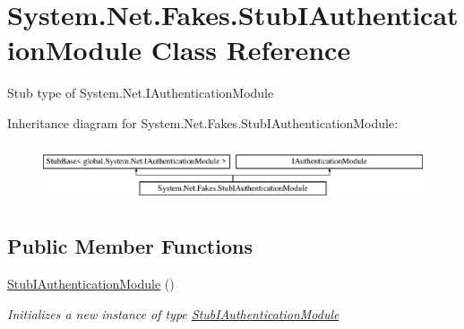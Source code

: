 \hypertarget{class_system_1_1_net_1_1_fakes_1_1_stub_i_authentication_module}{\section{System.\-Net.\-Fakes.\-Stub\-I\-Authentication\-Module Class Reference}
\label{class_system_1_1_net_1_1_fakes_1_1_stub_i_authentication_module}
}


Stub type of System.\-Net.\-I\-Authentication\-Module 


Inheritance diagram for System.\-Net.\-Fakes.\-Stub\-I\-Authentication\-Module\-:\begin{figure}[H]
\begin{center}
\leavevmode
\includegraphics[height=1.712538cm]{class_system_1_1_net_1_1_fakes_1_1_stub_i_authentication_module}
\end{center}
\end{figure}
\subsection*{Public Member Functions}
\begin{DoxyCompactItemize}
\item 
\hyperlink{class_system_1_1_net_1_1_fakes_1_1_stub_i_authentication_module_a0e4aa8f6fbaf4ace12a8e43ca03eb3fa}{Stub\-I\-Authentication\-Module} ()
\begin{DoxyCompactList}\small\item\em Initializes a new instance of type \hyperlink{class_system_1_1_net_1_1_fakes_1_1_stub_i_authentication_module}{Stub\-I\-Authentication\-Module}\end{DoxyCompactList}\end{DoxyCompactItemize}
